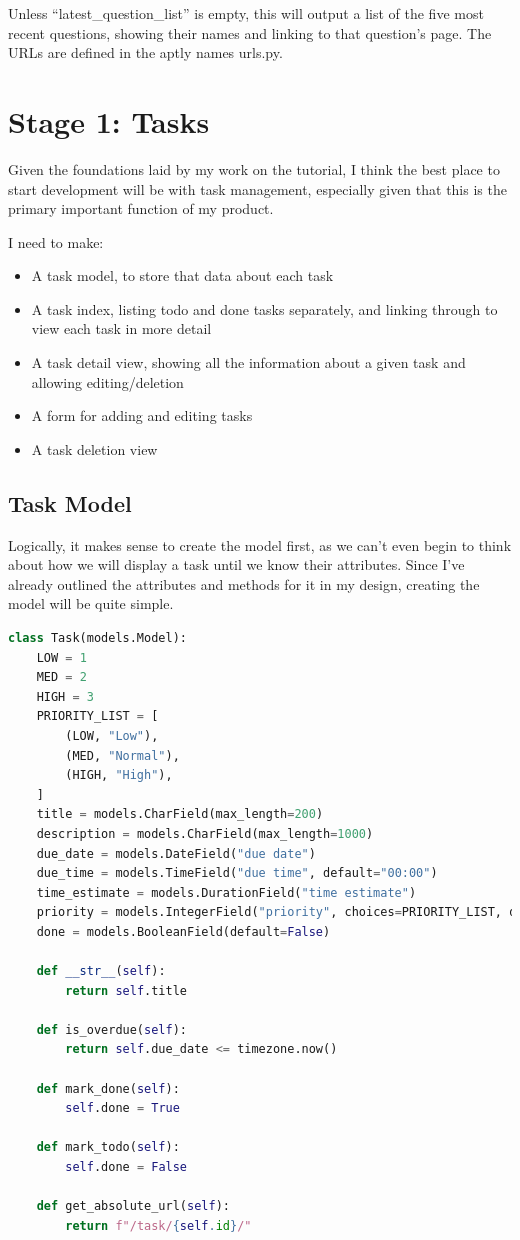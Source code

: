 \documentclass{article}
\begin{document}
Unless ``latest\_question\_list'' is empty,
this will output a list of the five most recent questions,
showing their names and linking to that question's page.
The URLs are defined in the aptly names urls.py.

\section{Stage 1: Tasks}
Given the foundations laid by my work on the tutorial,
I think the best place to start development will be with task management,
especially given that this is the primary important function of my product.

I need to make:
\begin{itemize}
	\item A task model,
	      to store that data about each task
	\item A task index,
	      listing todo and done tasks separately,
	      and linking through to view each task in more detail
	\item A task detail view,
	      showing all the information about a given task and allowing editing/deletion
	\item A form for adding and editing tasks
	\item A task deletion view
\end{itemize}

\subsection{Task Model}
Logically, it makes sense to create the model first,
as we can't even begin to think about how we will display a task until we know their attributes.
Since I've already outlined the attributes and methods for it in my design,
creating the model will be quite simple.

\begin{lstlisting}[language=Python, breaklines]
class Task(models.Model):
    LOW = 1
    MED = 2
    HIGH = 3
    PRIORITY_LIST = [
        (LOW, "Low"),
        (MED, "Normal"),
        (HIGH, "High"),
    ]
    title = models.CharField(max_length=200)
    description = models.CharField(max_length=1000)
    due_date = models.DateField("due date")
    due_time = models.TimeField("due time", default="00:00")
    time_estimate = models.DurationField("time estimate")
    priority = models.IntegerField("priority", choices=PRIORITY_LIST, default=2)
    done = models.BooleanField(default=False)

    def __str__(self):
        return self.title

    def is_overdue(self):
        return self.due_date <= timezone.now()

    def mark_done(self):
        self.done = True

    def mark_todo(self):
        self.done = False

    def get_absolute_url(self):
        return f"/task/{self.id}/"
\end{lstlisting}
\end{document}
